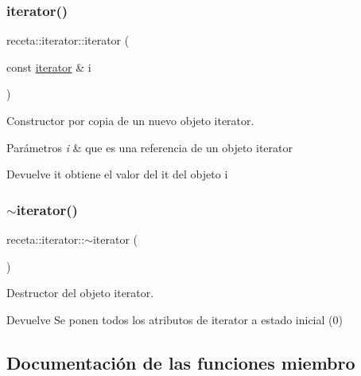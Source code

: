 \subsubsection{\texorpdfstring{iterator()}{iterator()}\hspace{0.1cm}{\footnotesize\ttfamily [3/3]}}
{\footnotesize\ttfamily receta\+::iterator\+::iterator (\begin{DoxyParamCaption}\item[{const \hyperlink{classreceta_1_1iterator}{iterator} \&}]{i }\end{DoxyParamCaption})\hspace{0.3cm}{\ttfamily [inline]}}



Constructor por copia de un nuevo objeto iterator. 


\begin{DoxyParams}{Parámetros}
{\em i} & que es una referencia de un objeto iterator \\
\hline
\end{DoxyParams}
\begin{DoxyReturn}{Devuelve}
it obtiene el valor del it del objeto i 
\end{DoxyReturn}
\mbox{\label{classreceta_1_1iterator_a9be0aae7ef0fbf74c1af38f822615aa2}} 
\subsubsection{\texorpdfstring{$\sim$iterator()}{~iterator()}}
{\footnotesize\ttfamily receta\+::iterator\+::$\sim$iterator (\begin{DoxyParamCaption}{ }\end{DoxyParamCaption})\hspace{0.3cm}{\ttfamily [inline]}}



Destructor del objeto iterator. 

\begin{DoxyReturn}{Devuelve}
Se ponen todos los atributos de iterator a estado inicial (0) 
\end{DoxyReturn}


\subsection{Documentación de las funciones miembro}
\mbox{\label{classreceta_1_1iterator_a08a0257876a2215954da163af770ca2d}} 

